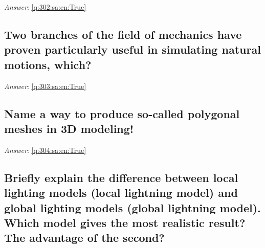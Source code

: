 \documentclass[a4paper,11pt,oneside]{article}
\begin{document}
\begin{sloppypar}
\label{q:302:sa:en:False}

\vspace{2cm}

\noindent\makebox[\textwidth]{\hrulefill}

\vspace{1cm}

\textit{Answer}: \autoref{q:302:sa:en:True}



\subsection{Two branches of the field of mechanics have proven particularly useful in simulating natural motions, which?}

\label{q:303:sa:en:False}

\vspace{2cm}

\noindent\makebox[\textwidth]{\hrulefill}

\vspace{1cm}

\textit{Answer}: \autoref{q:303:sa:en:True}



\subsection{Name a way to produce so-called polygonal meshes in 3D modeling!}

\label{q:304:sa:en:False}

\vspace{2cm}

\noindent\makebox[\textwidth]{\hrulefill}

\vspace{1cm}

\textit{Answer}: \autoref{q:304:sa:en:True}



\subsection{Briefly explain the difference between local lighting models (local lightning model) and global lighting models (global lightning model). Which model gives the most realistic result? The advantage of the second?}

\label{q:305:sa:en:False}

\vspace{2cm}

\noindent\makebox[\textwidth]{\hrulefill}


\end{sloppypar}
\end{document}
